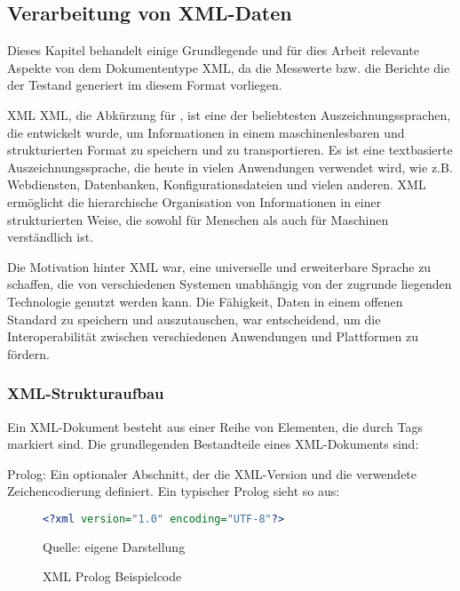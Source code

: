 \subsection{Verarbeitung von XML-Daten}
\label{subsec:verarbeitung-von-xml-daten}

Dieses Kapitel behandelt einige Grundlegende und für dies Arbeit relevante Aspekte von dem Dokumententype XML,
da die Messwerte bzw. die Berichte die der Testand generiert im diesem Format vorliegen.

\ac{XML}
\color{red}     %
XML, die Abkürzung für , ist eine der beliebtesten Auszeichnungssprachen, die entwickelt wurde,
um Informationen in einem maschinenlesbaren und strukturierten Format zu speichern und zu transportieren.
Es ist eine textbasierte Auszeichnungssprache, die heute in vielen Anwendungen verwendet wird, wie z.B. Webdiensten,
Datenbanken, Konfigurationsdateien und vielen anderen.
XML ermöglicht die hierarchische Organisation von Informationen in einer strukturierten Weise, die sowohl für Menschen
als auch für Maschinen verständlich ist.

Die Motivation hinter XML war, eine universelle und erweiterbare Sprache zu schaffen, die von verschiedenen Systemen
unabhängig von der zugrunde liegenden Technologie genutzt werden kann.
Die Fähigkeit, Daten in einem offenen Standard zu speichern und auszutauschen, war entscheidend,
um die Interoperabilität zwischen verschiedenen Anwendungen und Plattformen zu fördern.

\subsubsection{XML-Strukturaufbau}

Ein XML-Dokument besteht aus einer Reihe von Elementen, die durch Tags markiert sind.
Die grundlegenden Bestandteile eines XML-Dokuments sind:

Prolog: Ein optionaler Abschnitt, der die XML-Version und die verwendete Zeichencodierung definiert.
Ein typischer Prolog sieht so aus:

\begin{figure}[H]
\centering
\begin{minipage}{0.95\textwidth}
\begin{lstlisting}[language=XML]
<?xml version="1.0" encoding="UTF-8"?>
\end{lstlisting}
\end{minipage}
\caption{XML Prolog Beispielcode}
\label{fig:XML Prolog Beispielcode}
    {Quelle: eigene Darstellung}
\end{figure}


